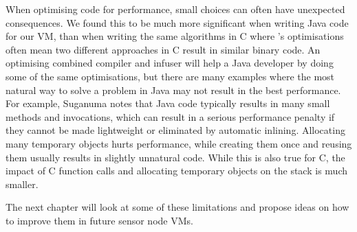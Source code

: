 When optimising code for performance, small choices can often have unexpected consequences. We found this to be much more significant when writing Java code for our VM, than when writing the same algorithms in C where 's optimisations often mean two different approaches in C result in similar binary code. An optimising combined compiler and infuser will help a Java developer by doing some of the same optimisations, but there are many examples where the most natural way to solve a problem in Java may not result in the best performance. For example, Suganuma \cite{Suganuma:2000vl} notes that Java code typically results in many small methods and invocations, which can result in a serious performance penalty if they cannot be made lightweight or eliminated by automatic inlining. Allocating many temporary objects hurts performance, while creating them once and reusing them usually results in slightly unnatural code. While this is also true for C, the impact of C function calls and allocating temporary objects on the stack is much smaller.

The next chapter will look at some of these limitations and propose ideas on how to improve them in future sensor node VMs.

